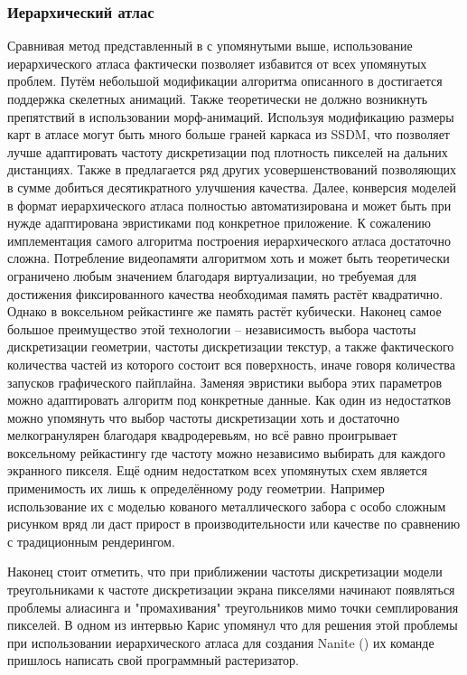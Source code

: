 \documentclass[12pt]{extarticle}
\begin{document}
\subsubsection{Иерархический атлас}
Сравнивая метод представленный в \cite{niski2007multi} с упомянутыми выше, использование иерархического атласа фактически позволяет избавится от всех упомянутых проблем. Путём небольшой модификации алгоритма описанного в \cite{feng2010feature} достигается поддержка скелетных анимаций. Также теоретически не должно возникнуть препятствий в использовании морф-анимаций. Используя модификацию \cite{feng2010feature} размеры карт в атласе могут быть много больше граней каркаса из SSDM, что позволяет лучше адаптировать частоту дискретизации под плотность пикселей на дальних дистанциях. Также в \cite{feng2010feature} предлагается ряд других усовершенствований позволяющих в сумме добиться десятикратного улучшения качества. Далее, конверсия моделей в формат иерархического атласа полностью автоматизирована и может быть при нужде адаптирована эвристиками под конкретное приложение. К сожалению имплементация самого алгоритма построения иерархического атласа достаточно сложна. Потребление видеопамяти алгоритмом хоть и может быть теоретически ограничено любым значением благодаря виртуализации, но требуемая для достижения фиксированного качества необходимая память растёт квадратично. Однако в воксельном рейкастинге же память растёт кубически. Наконец самое большое преимущество этой технологии -- независимость выбора частоты дискретизации геометрии, частоты дискретизации текстур, а также фактического количества частей из которого состоит вся поверхность, иначе говоря количества запусков графического пайплайна. Заменяя эвристики выбора этих параметров можно адаптировать алгоритм под конкретные данные. Как один из недостатков можно упомянуть что выбор частоты дискретизации хоть и достаточно мелкогранулярен благодаря квадродеревьям, но всё равно проигрывает воксельному рейкастингу где частоту можно независимо выбирать для каждого экранного пикселя. Ещё одним недостатком всех упомянутых схем является применимость их лишь к определённому роду геометрии. Например использование их с моделью кованого металлического забора с особо сложным рисунком вряд ли даст прирост в производительности или качестве по сравнению с традиционным рендерингом.

Наконец стоит отметить, что при приближении частоты дискретизации модели треугольниками к частоте дискретизации экрана пикселями начинают появляться проблемы алиасинга и "промахивания" треугольников мимо точки семплирования пикселей. В одном из интервью Карис упомянул что для решения этой проблемы при использовании иерархического атласа для создания Nanite (\cite{nanite}) их команде пришлось написать свой программный растеризатор.
\end{document}
